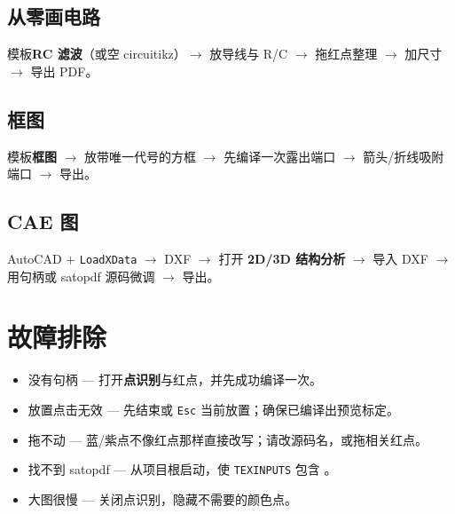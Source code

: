 \documentclass[a4paper]{ltxdoc}
\newcommand{\ui}[1]{\textbf{#1}}
\newcommand{\key}[1]{\texttt{#1}}
\begin{document}
\subsection{从零画电路}
模板\ui{RC 滤波}（或空 circuitikz）$\rightarrow$ 放导线与 R/C $\rightarrow$
拖红点整理 $\rightarrow$ 加尺寸 $\rightarrow$ 导出 PDF。

\subsection{框图}
模板\ui{框图} $\rightarrow$ 放带唯一代号的方框 $\rightarrow$
先编译一次露出端口 $\rightarrow$ 箭头/折线吸附端口 $\rightarrow$ 导出。

\subsection{CAE 图}
AutoCAD + \texttt{LoadXData} $\rightarrow$ DXF $\rightarrow$ 打开
\ui{2D/3D 结构分析} $\rightarrow$ 导入 DXF $\rightarrow$
用句柄或 \textsf{satopdf} 源码微调 $\rightarrow$ 导出。

\section{故障排除}

\begin{itemize}[nosep]
  \item 没有句柄 --- 打开\ui{点识别}与红点，并先成功编译一次。
  \item 放置点击无效 --- 先结束或 \key{Esc} 当前放置；确保已编译出预览标定。
  \item 拖不动 --- 蓝/紫点不像红点那样直接改写；请改源码名，或拖相关红点。
  \item 找不到 \textsf{satopdf} --- 从项目根启动，使 \texttt{TEXINPUTS}
        包含 。
  \item 大图很慢 --- 关闭点识别，隐藏不需要的颜色点。
\end{itemize}
\end{document}
